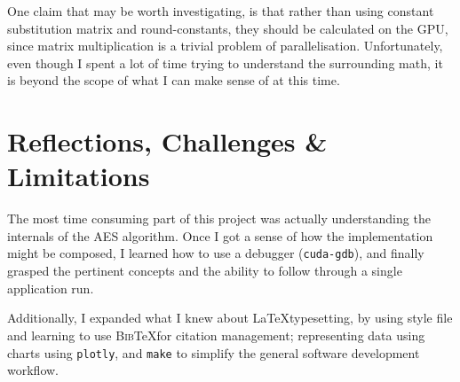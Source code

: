 \documentclass[letterpaper,twocolumn,10pt]{article}
\begin{document}
One claim that may be worth investigating, is that rather than using constant substitution matrix and round-constants, they should be calculated on the GPU, since matrix multiplication is a trivial problem of parallelisation. Unfortunately, even though I spent a lot of time trying to understand the surrounding math, it is beyond the scope of what I can make sense of at this time.

\section{Reflections, Challenges \& Limitations}
The most time consuming part of this project was actually understanding the internals of the AES algorithm. Once I got a sense of how the implementation might be composed, I learned how to use a debugger (\texttt{cuda-gdb}), and finally grasped the pertinent concepts and the ability to follow through a single application run.

Additionally, I expanded what I knew about \LaTeX typesetting, by using style file and learning to use \textsc{Bib}\negthinspace\TeX  for citation management; representing data using charts using \texttt{plotly}, and \texttt{make} to simplify the general software development workflow.

{\footnotesize 
}

\theendnotes
\end{document}
